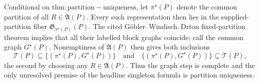 Conditional on \(\mathrm{thm:partition-uniqueness}\), let \(\pi^\star(P)\) denote the common partition of all \(R\in\mathfrak A(P)\).  Every such representation then lies in the supplied-partition fiber \(\mathfrak G_{\pi^\star(P)}(P)\).  The cited Göbler--Windisch--Drton fixed-partition theorem implies that all their labelled block graphs coincide; call the common graph \(G^\star(P)\).  Nonemptiness of \(\mathfrak A(P)\) then gives both inclusions
\[
 \mathcal T(P)\subseteq\{(\pi^\star(P),G^\star(P))\}
 \quad\text{and}\quad
 \{(\pi^\star(P),G^\star(P))\}\subseteq\mathcal T(P),
\]
the second by choosing any \(R\in\mathfrak A(P)\).  Thus the graph step is complete and the only unresolved premise of the headline singleton formula is partition uniqueness.